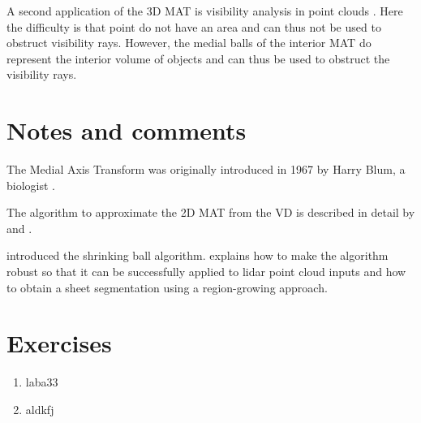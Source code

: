 A second application of the 3D MAT is visibility analysis in point clouds \citep{Peters15}.
Here the difficulty is that point do not have an area and can thus not be used to obstruct visibility rays.
However, the medial balls of the interior MAT do represent the interior volume of objects and can thus be used to obstruct the visibility rays.


\section{Notes and comments}
The Medial Axis Transform was originally introduced in 1967 by Harry Blum, a biologist \citep{Blum67}.

The algorithm to approximate the 2D MAT from the VD is described in detail by \citet{Gold99} and \citet{Gold01}.

\citet{Ma12} introduced the shrinking ball algorithm. \citet{Peters18} explains how to make the algorithm robust so that it can be successfully applied to lidar point cloud inputs and how to obtain a sheet segmentation using a region-growing approach.

%
\section{Exercises}

\begin{enumerate}
  \item laba33
  \item aldkfj
\end{enumerate}
